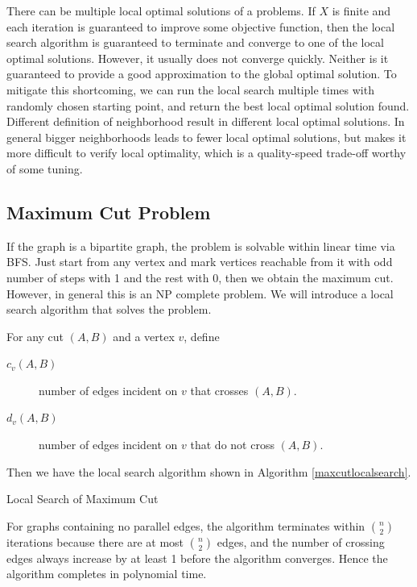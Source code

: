 There can be multiple local optimal solutions of a problems. If $X$ is finite and each iteration is guaranteed to improve some objective function, then the local search algorithm is guaranteed to terminate and converge to one of the local optimal solutions. However, it usually does not converge quickly. Neither is it guaranteed to provide a good approximation to the global optimal solution. To mitigate this shortcoming, we can run the local search multiple times with randomly chosen starting point, and return the best local optimal solution found. Different definition of neighborhood result in different local optimal solutions. In general bigger neighborhoods leads to fewer local optimal solutions, but makes it more difficult to verify local optimality, which is a quality-speed trade-off worthy of some tuning.
\subsection{Maximum Cut Problem}
\begin{description}
\end{description}
If the graph is a bipartite graph, the problem is solvable within linear time via BFS. Just start from any vertex and mark vertices reachable from it with odd number of steps with 1 and the rest with 0, then we obtain the maximum cut. However, in general this is an NP complete problem. We will introduce a local search algorithm that solves the problem.

For any cut $(A,B)$ and a vertex $v$, define 
\begin{description}
\item[$c_v(A,B)$]number of edges incident on $v$ that crosses $(A,B)$.
\item[$d_v(A,B)$]number of edges incident on $v$ that do not cross $(A,B)$.
\end{description}
Then we have the local search algorithm shown in Algorithm \ref{maxcutlocalsearch}.

\begin{algorithm}[ht]
\caption{Local Search of Maximum Cut}\label{maxcutlocalsearch}
\begin{algorithmic}[1]
\EndWhile
{}
\end{algorithmic}
\end{algorithm}
For graphs containing no parallel edges, the algorithm terminates within $\binom{n}{2}$ iterations because there are at most $\binom{n}{2}$ edges, and the number of crossing edges always increase by at least 1 before the algorithm converges. Hence the algorithm completes in polynomial time. 

